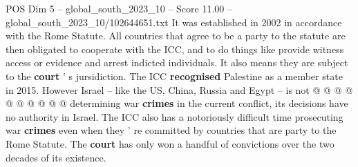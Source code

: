 \begin{textsample}{POS Dim 5 – global\_south\_2023\_10 – Score 11.00 – global\_south\_2023\_10/102644651.txt}
It was established in 2002 in accordance with the Rome Statute.
All countries that agree to be a party to the statute are then obligated to cooperate with the ICC, and to do things like provide witness access or evidence and arrest indicted individuals.
It also means they are subject to the \textbf{court} ' s jursidiction.
The ICC \textbf{recognised} Palestine as a member state in 2015.
However Israel -- like the US, China, Russia and Egypt -- is not @ @ @ @ @ @ @ @ @ @ determining war \textbf{crimes} in the current conflict, its decisions have no authority in Israel.
The ICC also has a notoriously difficult time prosecuting war \textbf{crimes} even when they ' re committed by countries that are party to the Rome Statute.
The \textbf{court} has only won a handful of convictions over the two decades of its existence.

\end{textsample}
